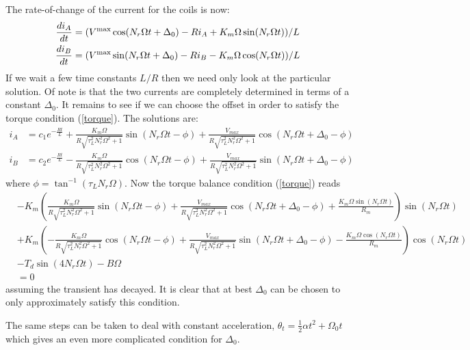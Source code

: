 \documentclass{article}
\begin{document}
\begin{appendix}
The rate-of-change of the current for the coils is now:
\begin{align}
\frac{di_A}{dt} &= (V^{\rm max} \cos(N_r \Omega t+\Delta_0) - R i_A + K_m \Omega \sin(N_r\Omega t) ) / L \\
\frac{di_B}{dt} &= ( V^{\rm max} \sin(N_r \Omega t +\Delta_0) - R i_B - K_m \Omega \cos(N_r\Omega t)  ) / L
\end{align}
If we wait a few time constants $L/R$ then we need only look at the particular solution. Of note is that the two currents are completely determined in terms of a constant $\Delta_0$. It remains to see if we can choose the offset in order to satisfy the torque condition (\ref{torque}). The solutions are:
\begin{align}
i_A &= c_1 e^{-\frac{R t}{L}}
+ \frac{K_m \Omega}{R \sqrt{\tau_L^2 N_r^2 \Omega ^2+1}}  \sin (N_r  \Omega t - \phi)
+ \frac{  V_{max}}{R  \sqrt{\tau_L^2 N_r^2 \Omega ^2+1} }  \cos (N_r \Omega t + \Delta_0 -\phi )  \\
i_B&=c_2 e^{-\frac{R t}{L}}
-  \frac{K_m \Omega}{R  \sqrt{\tau_L^2 N_r^2 \Omega ^2+1}} \cos ( N_r   \Omega t -\phi) 
+  \frac{V_{max}}{R \sqrt{\tau_L^2 N_r^2 \Omega ^2+1}}  \sin (N_r \Omega t + \Delta_0-\phi )
\end{align}
where $\phi = \tan^{-1}(\tau_L N_r \Omega)$. Now the torque balance condition (\ref{torque}) reads
\begin{equation}
\begin{split}
&-K_m \left(\frac{K_m \Omega}{R \sqrt{\tau_L^2 N_r^2 \Omega ^2+1}}  \sin (N_r  \Omega t - \phi)
+ \frac{  V_{max}}{R  \sqrt{\tau_L^2 N_r^2 \Omega ^2+1} }  \cos (N_r \Omega t + \Delta_0 -\phi )  + \frac{K_m \Omega \sin(N_r\Omega t)}{R_m}\right)\sin(N_r\Omega t) \\
&+ K_m \left(-  \frac{K_m \Omega}{R  \sqrt{\tau_L^2 N_r^2 \Omega ^2+1}} \cos ( N_r   \Omega t -\phi) 
+  \frac{V_{max}}{R \sqrt{\tau_L^2 N_r^2 \Omega ^2+1}}  \sin (N_r \Omega t + \Delta_0-\phi ) - \frac{K_m \Omega \cos(N_r\Omega t)}{R_m}\right) \cos(N_r\Omega t)\\
&- T_d\sin(4N_r\Omega t) - B \Omega\\ & = 0
\end{split}	 		
\end{equation}	
assuming the transient has decayed.  It is clear that at best $\Delta_0$ can be chosen to only approximately satisfy this condition. 

The same steps can be taken to deal with constant acceleration, $\theta_t = \frac{1}{2} \alpha t^2 + \Omega_0 t $ which gives an even more complicated condition for $\Delta_0$. 


\end{appendix}
\end{document}
